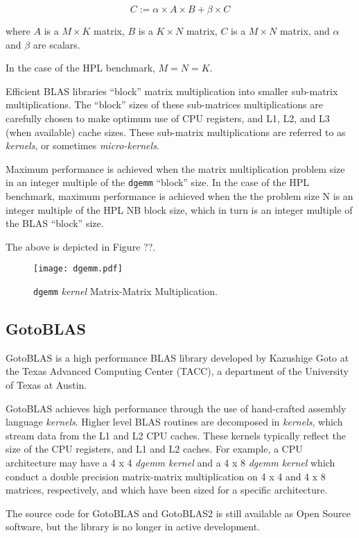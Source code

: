 \[C := \alpha \times A \times B + \beta \times C\]

where $A$ is a $M \times K$ matrix, $B$ is a $K \times N$ matrix, $C$ is a $M \times N$ matrix, and $\alpha$ and $\beta$ are scalars.

In the case of the HPL benchmark, $M = N = K$.

Efficient BLAS libraries ``block'' matrix multiplication into smaller sub-matrix multiplications. The ``block'' sizes of these sub-matrices multiplications are carefully chosen to make optimum use of CPU registers, and L1, L2, and L3 (when available) cache sizes. These sub-matrix multiplications are referred to as \emph{kernels}, or sometimes \emph{micro-kernels}.

Maximum performance is achieved when the matrix multiplication problem size in an integer multiple of the \verb|dgemm| ``block'' size. In the case of the HPL benchmark, maximum performance is achieved when the the problem size N is an integer multiple of the HPL NB block size, which in turn is an integer multiple of the BLAS ``block'' size.

The above is depicted in Figure ??.

\begin{figure}
	\centering
	\texttt{[image: dgemm.pdf]}
	\caption{\texttt{dgemm} \emph{kernel} Matrix-Matrix Multiplication.}
	\label{fig:image2}
\end{figure}


%
%
\subsection{GotoBLAS}

GotoBLAS is a high performance BLAS library developed by Kazushige Goto at the Texas Advanced Computing Center (TACC), a department of the University of Texas at Austin.

GotoBLAS achieves high performance through the use of hand-crafted assembly language \emph{kernels}. Higher level BLAS routines are decomposed in \emph{kernels}, which stream data from the L1 and L2 CPU caches. These kernels typically reflect the size of the CPU registers, and L1 and L2 caches. For example, a CPU architecture may have a 4 x 4 \emph{dgemm kernel} and a 4 x 8 \emph{dgemm kernel} which conduct a double precision matrix-matrix multiplication on 4 x 4 and 4 x 8 matrices, respectively, and which have been sized for a specific architecture.

The source code for GotoBLAS and GotoBLAS2 is still available as Open Source software, but the library is no longer in active development.


